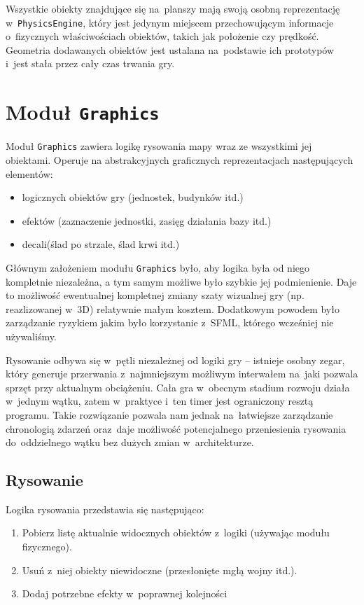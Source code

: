 \documentclass[licencjacka]{pracamgr}
\begin{document}
    Wszystkie obiekty znajdujące się na~planszy mają swoją osobną reprezentację w~\texttt{PhysicsEngine}, który jest jedynym miejscem
    przechowującym informacje o~fizycznych właściwościach obiektów, takich jak położenie czy prędkość. Geometria dodawanych obiektów
    jest ustalana na~podstawie ich prototypów i~jest stała przez cały czas trwania gry.

  \section{Moduł \texttt{Graphics}}
    Moduł \texttt{Graphics} zawiera logikę rysowania mapy wraz ze wszystkimi jej obiektami. Operuje na
    abstrakcyjnych graficznych reprezentacjach następujących elementów:
    \begin{itemize}
     \item logicznych obiektów gry (jednostek, budynków itd.)
     \item efektów (zaznaczenie jednostki, zasięg działania bazy itd.)
     \item decali\protect\footnotemark (ślad po strzale, ślad krwi itd.)
    \end{itemize}

    Głównym założeniem modułu \texttt{Graphics} było, aby logika była od niego kompletnie niezależna, a tym samym możliwe
    było szybkie jej podmienienie. Daje to możliwość ewentualnej kompletnej zmiany szaty wizualnej gry (np. reazlizowanej w~3D)
    relatywnie małym kosztem. Dodatkowym powodem było zarządzanie ryzykiem jakim było korzystanie z~SFML, którego wcześniej
    nie używaliśmy.

    Rysowanie odbywa się w~pętli niezależnej od logiki gry -- istnieje osobny zegar, który generuje
    przerwania z~najmniejszym możliwym interwałem na~jaki pozwala sprzęt przy aktualnym obciążeniu. Cała gra w~obecnym
    stadium rozwoju działa w~jednym wątku, zatem w~praktyce i~ten timer jest ograniczony resztą programu. Takie
    rozwiązanie pozwala nam jednak na~łatwiejsze zarządzanie chronologią zdarzeń oraz~daje możliwość potencjalnego
    przeniesienia rysowania do~oddzielnego wątku bez dużych zmian w~architekturze.

    \subsection{Rysowanie}
      Logika rysowania przedstawia się następująco:
      \begin{enumerate}
       \item Pobierz listę aktualnie widocznych obiektów z~logiki (używając modułu fizycznego).
       \item Usuń z~niej obiekty niewidoczne (przesłonięte mgłą wojny itd.).
       \item Dodaj potrzebne efekty w~poprawnej kolejności
      \end{enumerate}
\end{document}
